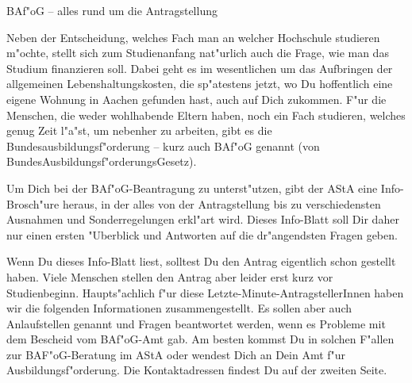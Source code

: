 
\begin{artikel}{BAf"oG -- alles rund um die Antragstellung}
\begin{window}
Neben der Entscheidung, welches Fach man an welcher Hochschule studieren m"ochte, stellt sich zum Studienanfang nat"urlich auch die Frage, wie man das Studium finanzieren soll. Dabei geht es im wesentlichen um das Aufbringen der allgemeinen Lebenshaltungskosten, die sp"atestens jetzt, wo Du hoffentlich eine eigene Wohnung in Aachen gefunden hast, auch auf Dich zukommen. F"ur die Menschen, die weder wohlhabende Eltern haben, noch ein Fach studieren, welches genug Zeit l"a"st, um nebenher zu arbeiten, gibt es die Bundesausbildungsf"orderung -- kurz auch BAf"oG genannt (von BundesAusbildungsf"orderungsGesetz).

Um Dich bei der BAf"oG-Beantragung zu unterst"utzen, gibt der AStA eine Info-Brosch"ure heraus, in der alles von der Antragstellung bis zu verschiedensten Ausnahmen und Sonderregelungen erkl"art wird. Dieses Info-Blatt soll Dir daher nur einen ersten "Uberblick und Antworten auf die dr"angendsten Fragen geben.

Wenn Du dieses Info-Blatt liest, solltest Du den Antrag eigentlich schon gestellt haben. Viele Menschen stellen den Antrag aber leider erst kurz vor Studienbeginn. Haupts"achlich f"ur diese Letzte-Minute-AntragstellerInnen haben wir die folgenden Informationen zusammengestellt. Es sollen aber auch Anlaufstellen genannt und Fragen beantwortet werden, wenn es Probleme mit dem Bescheid vom BAf"oG-Amt gab. Am besten kommst Du in solchen F"allen zur BAF"oG-Beratung im AStA oder wendest Dich an Dein Amt f"ur Ausbildungsf"orderung. Die Kontaktadressen findest Du auf der zweiten Seite.
\end{window}
\end{artikel}
